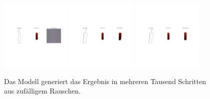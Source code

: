 \begin{figure}[h]
	\centering
	\includegraphics[width=0.3\textwidth]{bilder/0.jpg}
	\includegraphics[width=0.3\textwidth]{bilder/1.jpg}
	\includegraphics[width=0.3\textwidth]{bilder/15.jpg}
	\caption[Verschiedene Trainingsschritte]{Das Modell generiert das Ergebnis in mehreren Tausend Schritten aus zufälligem Rauschen.}
	\label{fig:trainingsteps}
\end{figure}


